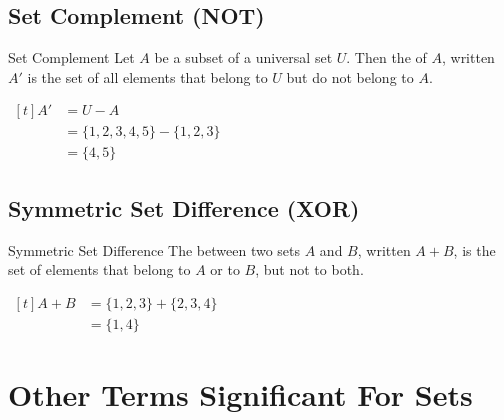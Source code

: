 \documentclass[\main/notes.tex]{subfiles}
\begin{document}
			\subsection[Set Complement]{Set Complement (NOT)}
				\begin{definition}{Set Complement}
					Let $A$ be a subset of a universal set $U$. Then the  of $A$, written $A'$ is the set of all elements that belong to $U$ but do not belong to $A$.
				\end{definition}
				\nopagebreak
				\begin{center}
					\begin{venntwo}[][$A' = \bigl\{x \mid x \notin A\bigr\}$]
						\fillNotA
					\end{venntwo}
				\end{center}
				\begin{example}[hbox] $
					\begin{aligned}[t]
						A' &= U - A\\
						&= \{1, 2, 3, 4, 5\} - \{1, 2, 3\}\\
						&= \{4, 5\}
					\end{aligned} $
				\end{example}

			\pagebreak
			\subsection[Symmetric Set Difference]{Symmetric Set Difference (XOR)}
				\begin{definition}{Symmetric Set Difference}
					The  between two sets $A$ and $B$, written $A + B$, is the set of elements that belong to $A$ or to $B$, but not to both.
				\end{definition}
				\nopagebreak
				\begin{center}
					\begin{venntwo}[][$A + B = \bigl\{x \mid x \in A$ or $x \in B$, but not both$\bigr\}$]
						\fillOnlyA
						\fillOnlyB
					\end{venntwo}
				\end{center}
				
				\begin{example}[hbox] $
					\begin{aligned}[t]
						A + B &= \{1, 2, 3\} + \{2, 3, 4\}\\
						&= \{1, 4\}
					\end{aligned} $
				\end{example}
		\section{Other Terms Significant For Sets}
\end{document}
